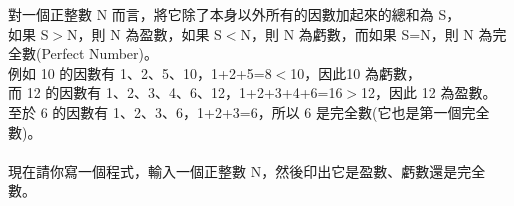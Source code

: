 對一個正整數 N 而言，將它除了本身以外所有的因數加起來的總和為 S，\\
如果 S$>$N，則 N 為盈數，如果 S$<$N，則 N 為虧數，而如果 S=N，則 N 為完全數(Perfect Number)。\\
例如 10 的因數有 1、2、5、10，1+2+5=8$<$10，因此10 為虧數，\\
而 12 的因數有 1、2、3、4、6、12，1+2+3+4+6=16$>$12，因此 12 為盈數。\\
至於 6 的因數有 1、2、3、6，1+2+3=6，所以 6 是完全數(它也是第一個完全數)。\\
\\
現在請你寫一個程式，輸入一個正整數 N，然後印出它是盈數、虧數還是完全數。\\
